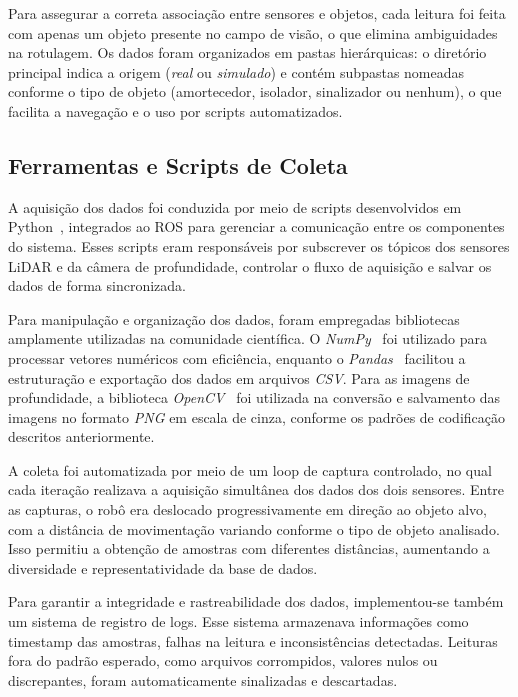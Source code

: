 Para assegurar a correta associação entre sensores e objetos, cada leitura foi feita com apenas um objeto presente no campo de visão, o que elimina ambiguidades na rotulagem. Os dados foram organizados em pastas hierárquicas: o diretório principal indica a origem (\textit{real} ou \textit{simulado}) e contém subpastas nomeadas conforme o tipo de objeto (amortecedor, isolador, sinalizador ou nenhum), o que facilita a navegação e o uso por scripts automatizados.

\subsection{Ferramentas e Scripts de Coleta}

A aquisição dos dados foi conduzida por meio de scripts desenvolvidos em Python~\cite{python}, integrados ao ROS para gerenciar a comunicação entre os componentes do sistema. Esses scripts eram responsáveis por subscrever os tópicos dos sensores LiDAR e da câmera de profundidade, controlar o fluxo de aquisição e salvar os dados de forma sincronizada.

Para manipulação e organização dos dados, foram empregadas bibliotecas amplamente utilizadas na comunidade científica. O \textit{NumPy}~\cite{2020NumPy-Array} foi utilizado para processar vetores numéricos com eficiência, enquanto o \textit{Pandas}~\cite{mckinney2010data} facilitou a estruturação e exportação dos dados em arquivos \textit{CSV}. Para as imagens de profundidade, a biblioteca \textit{OpenCV}~\cite{opencv_library} foi utilizada na conversão e salvamento das imagens no formato \textit{PNG} em escala de cinza, conforme os padrões de codificação descritos anteriormente.

A coleta foi automatizada por meio de um loop de captura controlado, no qual cada iteração realizava a aquisição simultânea dos dados dos dois sensores. Entre as capturas, o robô era deslocado progressivamente em direção ao objeto alvo, com a distância de movimentação variando conforme o tipo de objeto analisado. Isso permitiu a obtenção de amostras com diferentes distâncias, aumentando a diversidade e representatividade da base de dados.

Para garantir a integridade e rastreabilidade dos dados, implementou-se também um sistema de registro de logs. Esse sistema armazenava informações como timestamp das amostras, falhas na leitura e inconsistências detectadas. Leituras fora do padrão esperado, como arquivos corrompidos, valores nulos ou discrepantes, foram automaticamente sinalizadas e descartadas.

